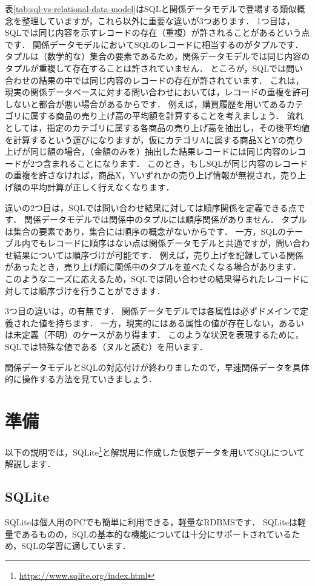 表\ref{tab:sql-vs-relational-data-model}はSQLと関係データモデルで登場する類似概念を整理していますが，これら以外に重要な違いが3つあります．
1つ目は，SQLでは同じ内容を示すレコードの存在（重複）が許されることがあるという点です．
関係データモデルにおいてSQLのレコードに相当するのがタプルです．
タプルは（数学的な）集合の要素であるため，関係データモデルでは同じ内容のタプルが重複して存在することは許されていません．
ところが，SQLでは問い合わせの結果の中では同じ内容のレコードの存在が許されています．
これは，現実の関係データベースに対する問い合わせにおいては，レコードの重複を許可しないと都合が悪い場合があるからです．
例えば，購買履歴を用いてあるカテゴリに属する商品の売り上げ高の平均額を計算することを考えましょう．
流れとしては，指定のカテゴリに属する各商品の売り上げ高を抽出し，その後平均値を計算するという運びになりますが，仮にカテゴリAに属する商品XとYの売り上げが同じ額の場合，（金額のみを）抽出した結果レコードには同じ内容のレコードが2つ含まれることになります．
このとき，もしSQLが同じ内容のレコードの重複を許さなければ，商品X，Yいずれかの売り上げ情報が無視され，売り上げ額の平均計算が正しく行えなくなります．

違いの2つ目は，SQLでは問い合わせ結果に対しては順序関係を定義できる点です．
関係データモデルでは関係中のタプルには順序関係がありません．
タプルは集合の要素であり，集合には順序の概念がないからです．
一方，SQLのテーブル内でもレコードに順序はない点は関係データモデルと共通ですが，問い合わせ結果については順序づけが可能です．
例えば，売り上げを記録している関係があったとき，売り上げ順に関係中のタプルを並べたくなる場合があります．
このようなニーズに応えるため，SQLでは問い合わせの結果得られたレコードに対しては順序づけを行うことができます．

3つ目の違いは，の有無です．
関係データモデルでは各属性は必ずドメインで定義された値を持ちます．
一方，現実的にはある属性の値が存在しない，あるいは未定義（不明）のケースがあり得ます．
このような状況を表現するために，SQLでは特殊な値である（ヌルと読む）を用います．

関係データモデルとSQLの対応付けが終わりましたので，早速関係データを具体的に操作する方法を見ていきましょう．


\section{準備}
以下の説明では，SQLite\footnote{\url{https://www.sqlite.org/index.html}}と解説用に作成した仮想データを用いてSQLについて解説します．

\subsection{SQLite}
SQLiteは個人用のPCでも簡単に利用できる，軽量なRDBMSです．
SQLiteは軽量であるものの，SQLの基本的な機能については十分にサポートされているため，SQLの学習に適しています．

